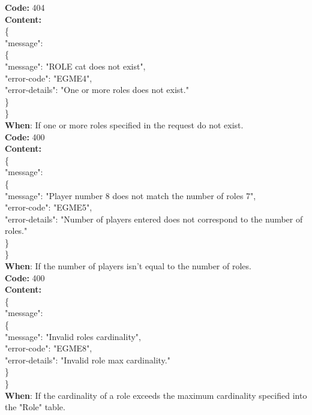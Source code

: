 \begin{itemize}
        \textbf{Code:} 404\\
        \textbf{Content:}\\
        \{\\
        \tab "message": \\
        \tab \{\\
        \tab \tab "message": "ROLE cat does not exist",\\
        \tab \tab "error-code": "EGME4",\\
        \tab \tab "error-details": "One or more roles does not exist."\\
         \tab \}\\
        \}\\
        \textbf{When}: If one or more roles specified in the request do not exist. \\
        
        \textbf{Code:} 400\\
        \textbf{Content:}\\
        \{\\
        \tab "message": \\
        \tab \{\\
        \tab \tab "message": "Player number 8 does not match the number of roles 7",\\
        \tab \tab "error-code": "EGME5",\\
        \tab \tab "error-details": "Number of players entered does not correspond to the number of roles."\\
         \tab \}\\
        \}\\
        \textbf{When}: If the number of players isn't equal to the number of roles.\\

        
        \textbf{Code:} 400\\
        \textbf{Content:}\\
        \{\\
        \tab "message": \\
        \tab \{\\
        \tab \tab "message": "Invalid roles cardinality",\\
        \tab \tab "error-code": "EGME8",\\
        \tab \tab "error-details": "Invalid role max cardinality."\\
         \tab \}\\
        \}\\
        \textbf{When}: If the cardinality of a role exceeds the maximum cardinality specified into the "Role" table.\\


\end{itemize}
